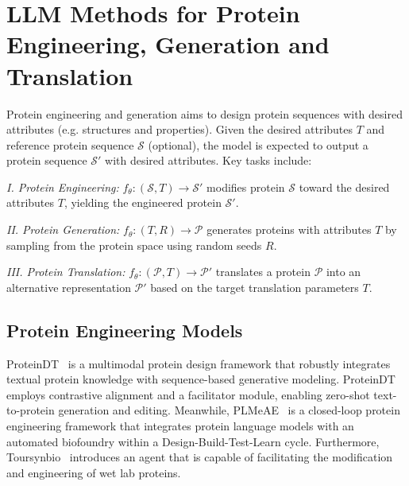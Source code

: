


\section{LLM Methods for Protein Engineering, Generation and Translation}
\label{sec:llm_generation}


Protein engineering and generation aims to design protein sequences with desired attributes (e.g. structures and properties). Given the desired attributes \(T\) and reference protein sequence \(\mathcal{S}\) (optional), the model is expected to output a protein sequence \(\mathcal{S}'\) with desired attributes. Key tasks include:

\noindent \textit{I. Protein Engineering:} 
\( f_\theta: (\mathcal{S}, T) \rightarrow \mathcal{S}' \) modifies protein \(\mathcal{S}\) toward the desired attributes \(T\), yielding the engineered protein \(\mathcal{S}'\).

\noindent \textit{II. Protein Generation:} 
\( f_\theta: (T, R) \rightarrow \mathcal{P} \) generates proteins with attributes \(T\) by sampling from the protein space using random seeds \(R\).



\noindent \textit{III. Protein Translation:} \( f_\theta: (\mathcal{P},T) \rightarrow \mathcal{P'} \) translates a protein \( \mathcal{P} \) into an alternative representation \( \mathcal{P}' \)  based on the target translation parameters \( T \). 



\subsection{Protein Engineering Models}

ProteinDT~\cite{liu2023text} is a multimodal protein design framework that robustly integrates textual protein knowledge with sequence-based generative modeling. ProteinDT employs contrastive alignment and a facilitator module, enabling zero-shot text-to-protein generation and editing. %
Meanwhile, PLMeAE~\cite{plmeae} is a closed-loop protein engineering framework that integrates protein language models with an automated biofoundry within a Design-Build-Test-Learn cycle.
Furthermore, Toursynbio~\cite{shen2024toursynbio} introduces an agent that is capable of facilitating the modification and engineering of wet lab proteins.



